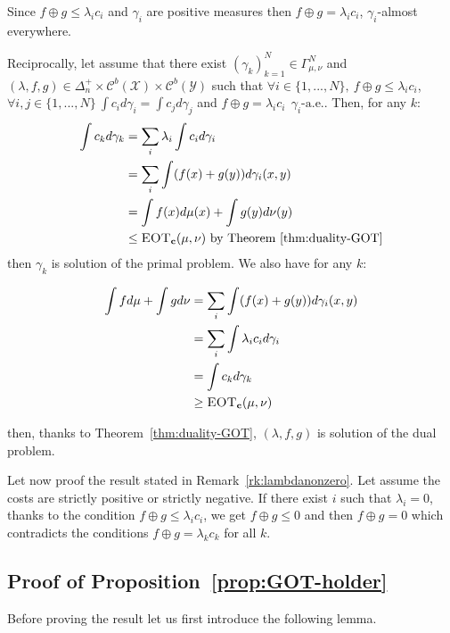 \begin{prv*}
Since $f\oplus g\leq \lambda_ic_i$ and $\gamma_i$ are positive measures then $f\oplus g= \lambda_ic_i$, $\gamma_i$-almost everywhere.


Reciprocally, let assume that there exist $(\gamma_k)_{k=1}^N\in\Gamma^N_{\mu,\nu}$ and $(\lambda,f,g)\in \Delta_n^{+}\times\mathcal{C}^b(\mathcal{X})\times\mathcal{C}^b(\mathcal{Y})$ such that $\forall i\in\{1,...,N\},~ f\oplus g\leq\lambda_i c_i$,  $\forall i,j\in\{1,...,N\}~\int c_i d\gamma_i=\int c_j d\gamma_j$ and $f \oplus g= \lambda_i c_i ~~\gamma_{i}\text{-a.e.}$. Then, for any $k$:
\begin{align*}
\int c_k d\gamma_k &= \sum_i\lambda_i\int c_id\gamma_i\\
&= \sum_i\int(f(x)+g(y))d\gamma_i(x,y)\\
&= \int f(x)d\mu(x)+\int g(y)d\nu(y)\\
&\leq \textsc{EOT}_{\mathbf{c}}(\mu,\nu)\text{ by Theorem~\ref{thm:duality-GOT}}
\end{align*}
then $\gamma_k$ is solution of the primal problem. We also have for any $k$:

\begin{align*}
\int fd\mu +\int gd\nu &= \sum_i\int(f(x)+g(y))d\gamma_i(x,y)\\
&= \sum_i\int\lambda_i c_id\gamma_i\\
&=\int c_k d\gamma_k\\
&\geq \textsc{EOT}_{\mathbf{c}}(\mu,\nu)\\
\end{align*}
\end{prv*}
then, thanks to Theorem~\ref{thm:duality-GOT}, $(\lambda,f,g)$ is solution of the dual problem.

Let now proof the result stated in Remark~\ref{rk:lambdanonzero}. Let assume the costs are strictly positive or strictly negative. If there exist $i$ such that $\lambda_i=0$, thanks to the condition $f\oplus g\leq \lambda_i c_i$, we get $f\oplus g\leq0$ and then $f\oplus g=0$ which contradicts the conditions $f\oplus g = \lambda_kc_k$ for all $k$. 




\subsection{Proof of Proposition~\ref{prop:GOT-holder}}
\label{prv:GOT-holder}



Before proving the result let us first introduce the following lemma.

